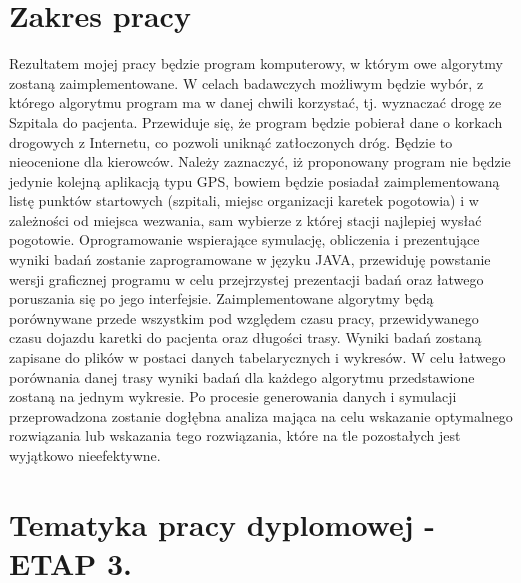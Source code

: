 \documentclass[12pt]{article} %
\begin{document}
\section{Zakres pracy}
Rezultatem mojej pracy będzie program komputerowy, w którym owe algorytmy zostaną zaimplementowane. W celach badawczych możliwym będzie wybór, z którego algorytmu program ma w danej chwili korzystać, tj. wyznaczać drogę ze Szpitala do pacjenta. Przewiduje się, że program będzie pobierał dane o korkach drogowych z Internetu, co pozwoli uniknąć zatłoczonych dróg. Będzie to nieocenione dla kierowców. Należy zaznaczyć, iż proponowany program nie będzie jedynie kolejną aplikacją typu GPS, bowiem będzie posiadał zaimplementowaną listę punktów startowych (szpitali, miejsc organizacji karetek pogotowia) i w zależności od miejsca wezwania, sam wybierze z której stacji najlepiej wysłać pogotowie.
Oprogramowanie wspierające symulację, obliczenia i prezentujące wyniki badań zostanie zaprogramowane w języku JAVA, przewiduję powstanie wersji graficznej programu w celu przejrzystej prezentacji badań oraz łatwego poruszania się po jego interfejsie.
Zaimplementowane algorytmy będą porównywane przede wszystkim pod względem czasu pracy, przewidywanego czasu dojazdu karetki do pacjenta oraz długości trasy. Wyniki badań zostaną zapisane do plików w postaci danych tabelarycznych i wykresów. W celu łatwego porównania danej trasy wyniki badań dla każdego algorytmu przedstawione zostaną na jednym wykresie.
Po procesie generowania danych i symulacji przeprowadzona zostanie dogłębna analiza mająca na celu wskazanie optymalnego rozwiązania lub wskazania tego rozwiązania, które na tle pozostałych jest wyjątkowo nieefektywne.
\section{Tematyka pracy dyplomowej - ETAP 3.}
\end{document}
